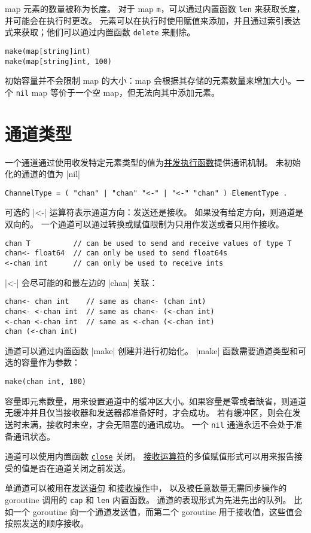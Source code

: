 map 元素的数量被称为长度。
对于 map \lstinline|m|，可以通过内置函数 \lstinline|len| 来获取长度，并可能会在执行时更改。
元素可以在执行时使用赋值来添加，并且通过索引表达式来获取；他们可以通过内置函数 \lstinline|delete| 来删除。
\begin{lstlisting}[style=golang]
make(map[string]int)
make(map[string]int, 100)
\end{lstlisting}
初始容量并不会限制 map 的大小：map 会根据其存储的元素数量来增加大小。一个 \lstinline|nil| map
等价于一个空 map，但无法向其中添加元素。

\section{通道类型} \label{sec:channel type}
一个通道通过使用收发特定元素类型的值为\hyperref[sec:go statement]{并发执行函数}提供通讯机制。
未初始化的通道的值为 \gocode|nil|
\begin{lstlisting}[style=EBNF]
ChannelType = ( "chan" | "chan" "<-" | "<-" "chan" ) ElementType .
\end{lstlisting}

可选的 \gocode|<-| 运算符表示通道方向：发送还是接收。
如果没有给定方向，则通道是双向的。
一个通道可以通过转换或赋值限制为只用作发送或者只用作接收。
\begin{lstlisting}[style=golang]
chan T          // can be used to send and receive values of type T
chan<- float64  // can only be used to send float64s
<-chan int      // can only be used to receive ints
\end{lstlisting}

\gocode|<-| 会尽可能的和最左边的 \gocode|chan| 关联：
\begin{lstlisting}[style=golang]
chan<- chan int    // same as chan<- (chan int)
chan<- <-chan int  // same as chan<- (<-chan int)
<-chan <-chan int  // same as <-chan (<-chan int)
chan (<-chan int)
\end{lstlisting}

通道可以通过内置函数 \gocode|make| 创建并进行初始化。
\gocode|make| 函数需要通道类型和可选的容量作为参数：
\begin{lstlisting}[style=golang]
make(chan int, 100)
\end{lstlisting}

容量即元素数量，用来设置通道中的缓冲区大小。如果容量是零或者缺省，则通道无缓冲并且仅当接收器和发送器都准备好时，才会成功。
若有缓冲区，则会在发送时未满，接收时未空，才会无阻塞的通讯成功。
一个 \lstinline|nil| 通道永远不会处于准备通讯状态。

通道可以使用内置函数 \hyperref[sec:close]{\lstinline|close|} 关闭。
\hyperref[sec:recv operator]{接收运算符}的多值赋值形式可以用来报告接受的值是否在通道关闭之前发送。

单通道可以被用在\hyperref[sec:send statement]{发送语句}
和\hyperref[sec:recv operator]{接收操作}中，
以及被任意数量无需同步操作的 goroutine 调用的 \lstinline|cap| 和 \lstinline|len| 内置函数。
通道的表现形式为先进先出的队列。
比如一个 goroutine 向一个通道发送值，而第二个 goroutine 用于接收值，这些值会按照发送的顺序接收。




